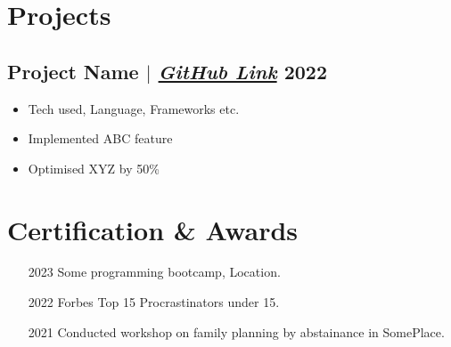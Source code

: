 \documentclass[11pt]{article}
\begin{document}
\section{Projects}
\subsection{Project Name {\normalfont $|$ \href{http://github.com}{\textit{GitHub Link}}} \hfill 2022}
\begin{itemize}
    \item Tech used, Language, Frameworks etc.
    \item Implemented ABC feature
    \item Optimised XYZ by 50\%
\end{itemize}

\section{Certification \& Awards}
\begin{enumerate}[itemsep=0pt]
  \item [2023] Some programming bootcamp, Location.
  \item [2022] Forbes Top 15 Procrastinators under 15.
  \item [2021] Conducted workshop on family planning by abstainance in SomePlace.
\end{enumerate}
\end{document}
